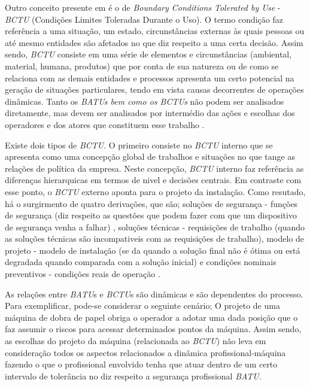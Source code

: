 Outro conceito presente em \cite{safety} é o de \textit{Boundary Conditions Tolerated by Use} - \textit{BCTU} (Condições Limites Toleradas Durante o Uso). O termo condição faz referência a 
uma situação, um estado, circunstâncias externas às quais pessoas ou até mesmo entidades são afetados no que diz respeito a uma certa decisão. Assim sendo, \textit{BCTU} consiste em uma série 
de elementos e circunstâncias (ambiental, material, humana, produtos) que por conta de sua natureza ou de como se relaciona com as demais entidades e processos apresenta um certo potencial 
na geração de situações particulares, tendo em vista causas decorrentes de operações dinâmicas. Tanto os \textit{BATUs bem como os BCTUs} não podem ser analisados diretamente, mas devem ser 
analisados por intermédio das ações e escolhas dos operadores e dos atores que constituem esse trabalho \cite{safety}. 

Existe dois tipos de \textit{BCTU}. O primeiro consiste no \textit{BCTU} interno que se apresenta como uma concepção global de trabalhos e situações no que tange as relações de política 
da empresa. Neste concepção, \textit{BCTU} interno faz referência as diferenças hierarquicas em termos de nivel e decisões centrais. Em contraste com esse ponto, o \textit{BCTU} externo
aponta para o projeto da instalação. Como resutado, há o surgirmento de quatro derivações, que são; soluções de segurança - funções de segurança (diz respeito as questões que podem fazer
com que um dispositivo de segurança venha a falhar) , soluções técnicas - requisições de trabalho (quando as soluções técnicas são incompativeis com as requisições de trabalho), modelo de 
projeto - modelo de instalação (se da quando a solução final não é ótima ou está degradada quando comparada com a solução inicial) e condições nominais preventivos - condições reais de operação
\cite{safety}.

As relações entre \textit{BATU}s e \textit{BCTU}s são dinâmicas e são dependentes do processo. Para exemplificar, pode-se considerar o seguinte cenário; O projeto de uma máquina de dobra de papel
obriga o operador a adotar uma dada posição que o faz assumir o riscos para acessar determinados pontos da máquina.  Assim sendo, as escolhas do projeto da máquina (relacionada ao \textit{BCTU})
não leva em consideração todos os aspectos relacionados a dinâmica profissional-máquina fazendo o que o profissional envolvido tenha que atuar dentro de um certo intervalo de tolerância no
diz respeito a segurança profissional \textit{BATU}.
